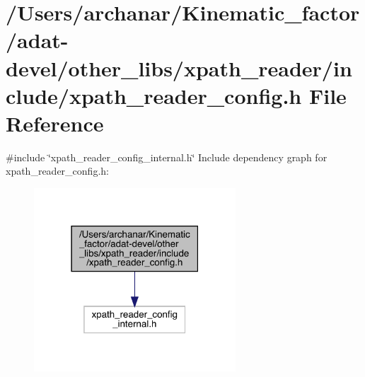 \hypertarget{adat-devel_2other__libs_2xpath__reader_2include_2xpath__reader__config_8h}{}\section{/\+Users/archanar/\+Kinematic\+\_\+factor/adat-\/devel/other\+\_\+libs/xpath\+\_\+reader/include/xpath\+\_\+reader\+\_\+config.h File Reference}
\label{adat-devel_2other__libs_2xpath__reader_2include_2xpath__reader__config_8h}
{\ttfamily \#include \char`\"{}xpath\+\_\+reader\+\_\+config\+\_\+internal.\+h\char`\"{}}\newline
Include dependency graph for xpath\+\_\+reader\+\_\+config.\+h\+:
\nopagebreak
\begin{figure}[H]
\begin{center}
\leavevmode
\includegraphics[width=214pt]{d6/d5e/adat-devel_2other__libs_2xpath__reader_2include_2xpath__reader__config_8h__incl}
\end{center}
\end{figure}
